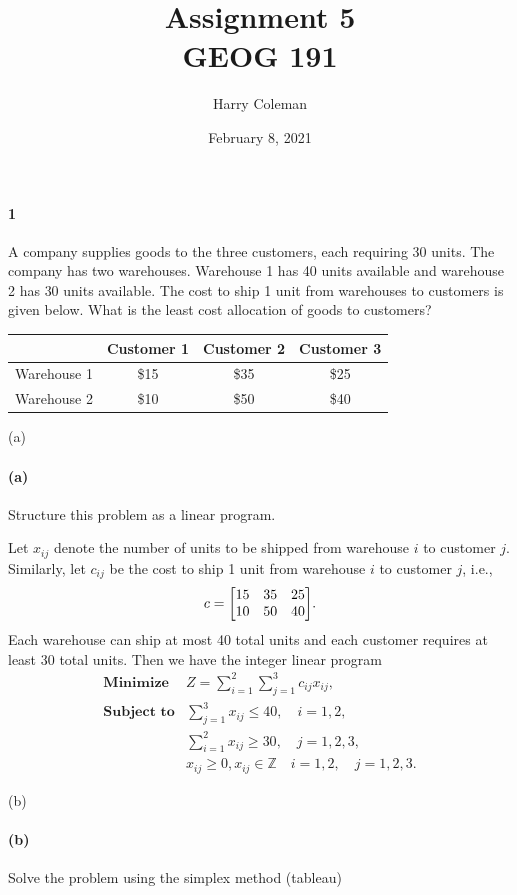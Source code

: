 \documentclass[12pt]{article}
\title{\vspace{-0.5in}Assignment 5\\
    \large GEOG 191
}
\author{Harry Coleman}
\date{February 8, 2021}
\newenvironment{fullbox}{\begin{lrbox}{\savefullbox}\begin{minipage}{\dimexpr\textwidth-2\fboxsep\relax}}{\end{minipage}\end{lrbox}\begin{center}\framebox[\textwidth]{\usebox{\savefullbox}}\end{center}}
\newenvironment{pbox}[1][]{\begin{fullbox}\ifx#1\empty\else\paragraph{#1}\fi}{\end{fullbox}}
\theoremstyle{definition}
\newcommand{\ds}{\displaystyle}
\newcommand{\Z}{\mathbb{Z}}
\begin{document}
\maketitle


\begin{pbox}[1]
    A company supplies goods to the three customers, each requiring 30 units. The company has two warehouses. Warehouse 1 has 40 units available and warehouse 2 has $30$ units available. The cost to ship 1 unit from warehouses to customers is given below. What is the least cost allocation of goods to customers?
    \begin{center}
        \begin{tabular}{|l|c|c|c|}
            \hline
                        & Customer 1 & Customer 2 & Customer 3 \\ \hline
            Warehouse 1 & \$15       & \$35       & \$25       \\ \hline
            Warehouse 2 & \$10       & \$50       & \$40       \\ \hline
        \end{tabular}
    \end{center}
\end{pbox}

\begin{pbox}[(a)]
    Structure this problem as a linear program.
\end{pbox}

Let $x_{ij}$ denote the number of units to be shipped from warehouse $i$ to customer $j$. Similarly, let $c_{ij}$ be the cost to ship 1 unit from warehouse $i$ to customer $j$, i.e.,
\[
    c = \mqty[15 & 35 & 25 \\ 10 & 50 & 40].
\]
Each warehouse can ship at most 40 total units and each customer requires at least 30 total units. Then we have the integer linear program
\[\begin{array}{ll}
    \textbf{Minimize} & Z = \ds\sum_{i=1}^2 \sum_{j=1}^3 c_{ij}x_{ij}, \\
    \textbf{Subject to} & \ds\sum_{j=1}^3 x_{ij} \leq 40, \quad i = 1, 2, \\
        & \ds\sum_{i=1}^2 x_{ij} \geq 30, \quad j = 1, 2, 3, \\
        & x_{ij} \geq 0, x_{ij} \in \Z \quad i = 1, 2, \quad j = 1, 2, 3.
\end{array}\]

\newpage
\begin{pbox}[(b)]
    Solve the problem using the simplex method (tableau)
\end{pbox}
\end{document}

